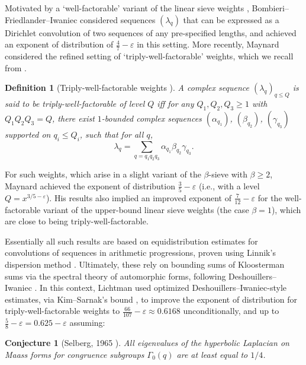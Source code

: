 \documentclass[reqno,11pt]{amsart}
\newtheorem{conjecture}[theorem]{Conjecture}
\newtheorem{definition}[theorem]{Definition}
\theoremstyle{remark}
\numberwithin{equation}{section}
\newcommand{\eps}{\varepsilon}
\begin{document}
Motivated by a `well-factorable' variant of the linear sieve weights \cite{iwaniec1980new,fouvry1983primes}, Bombieri--Friedlander--Iwaniec \cite[Theorem 10]{bombieri1986primes} considered sequences $(\lambda_q)$ that can be expressed as a Dirichlet convolution of two sequences of any pre-specified lengths, and achieved an exponent of distribution of $\tfrac{4}{7}-\eps$ in this setting. More recently, Maynard \cite{maynard2025primes2} considered the refined setting of `triply-well-factorable' weights, which we recall from \cite[Definition 2]{maynard2025primes2}.

\begin{definition}[Triply-well-factorable weights \cite{maynard2025primes2}] \label{def:triply-well-fact}
A complex sequence $(\lambda_q)_{q \le Q}$ is said to be \emph{triply-well-factorable} of level $Q$ iff for any $Q_1, Q_2, Q_3 \ge 1$ with $Q_1 Q_2 Q_3 = Q$, there exist $1$-bounded complex sequences $(\alpha_{q_1})$, $(\beta_{q_2})$, $(\gamma_{q_3})$ supported on $q_i \le Q_i$, such that for all $q$,
\[
    \lambda_q
    =
    \sum_{q = q_1 q_2 q_3} \alpha_{q_1} \beta_{q_2} \gamma_{q_3}.
\]
\end{definition}

For such weights, which arise in a slight variant of the $\beta$-sieve with $\beta \ge 2$, Maynard \cite[Theorem 1.1]{maynard2025primes2} achieved the exponent of distribution $\tfrac{3}{5} - \eps$ (i.e., with a level $Q = x^{3/5-\eps}$). His results also implied an improved exponent of $\tfrac{7}{12}-\eps$ for the well-factorable variant of the upper-bound linear sieve weights (the case $\beta = 1$), which are close to being triply-well-factorable.

Essentially all such results are based on equidistribution estimates for convolutions of sequences in arithmetic progressions, proven using Linnik's dispersion method \cite{linnik1963dispersion}. Ultimately, these rely on bounding sums of Kloosterman sums via the spectral theory of automorphic forms, following Deshouillers--Iwaniec \cite{deshouillers1982kloosterman}. In this context, Lichtman \cite{lichtman2023primes} used optimized Deshouillers--Iwaniec-style estimates, via Kim--Sarnak's bound \cite{kim2003functoriality}, to improve the exponent of distribution for triply-well-factorable weights to $\tfrac{66}{107} - \eps \approx 0.6168$ unconditionally, and up to $\tfrac{5}{8} - \eps = 0.625 - \eps$ assuming:

\begin{conjecture}[Selberg, 1965 \cite{selberg1965estimation}] \label{conj:selberg}
    All eigenvalues of the hyperbolic Laplacian on Maass forms for congruence subgroups $\Gamma_0(q)$ are at least equal to $1/4$.
\end{conjecture}
\end{document}
